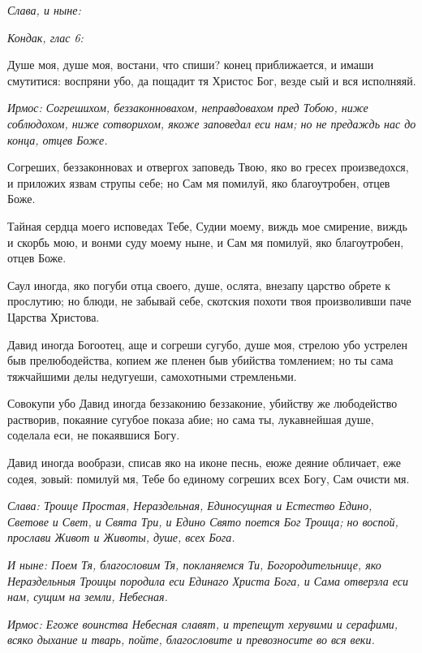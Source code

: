 \itshape Слава, и ныне\normalfont{}: 

\itshape Кондак, глас 6: 

\normalfont{}Душе моя, душе моя, востани, что спиши? конец приближается, и имаши смутитися: воспряни убо, да пощадит тя Христос Бог, везде сый и вся исполняяй. 


\itshape Ирмос\normalfont{}: Согрешихом, беззаконновахом, неправдовахом пред Тобою, ниже соблюдохом, ниже сотворихом, якоже заповедал еси нам; но не предаждь нас до конца, отцев Боже. 

Согреших, беззаконновах и отвергох заповедь Твою, яко во гресех произведохся, и приложих язвам струпы себе; но Сам мя помилуй, яко благоутробен, отцев Боже. 

Тайная сердца моего исповедах Тебе, Судии моему, виждь мое смирение, виждь и скорбь мою, и вонми суду моему ныне, и Сам мя помилуй, яко благоутробен, отцев Боже. 

Саул иногда, яко погуби отца своего, душе, ослята, внезапу царство обрете к прослутию; но блюди, не забывай себе, скотския похоти твоя произволивши паче Царства Христова. 

Давид иногда Богоотец, аще и согреши сугубо, душе моя, стрелою убо устрелен быв прелюбодейства, копием же пленен быв убийства томлением; но ты сама тяжчайшими делы недугуеши, самохотными стремленьми. 

Совокупи убо Давид иногда беззаконию беззаконие, убийству же любодейство растворив, покаяние сугубое показа абие; но сама ты, лукавнейшая душе, соделала еси, не покаявшися Богу. 

Давид иногда вообрази, списав яко на иконе песнь, еюже деяние обличает, еже содея, зовый: помилуй мя, Тебе бо единому согреших всех Богу, Сам очисти мя. 

\itshape Слава\normalfont{}: Троице Простая, Нераздельная, Единосущная и Естество Едино, Светове и Свет, и Свята Три, и Едино Свято поется Бог Троица; но воспой, прослави Живот и Животы, душе, всех Бога. 

\itshape И ныне\normalfont{}: Поем Тя, благословим Тя, покланяемся Ти, Богородительнице, яко Нераздельныя Троицы породила еси Единаго Христа Бога, и Сама отверзла еси нам, сущим на земли, Небесная. 


\itshape Ирмос\normalfont{}: Егоже воинства Небесная славят, и трепещут херувими и серафими, всяко дыхание и тварь, пойте, благословите и превозносите во вся веки. 

